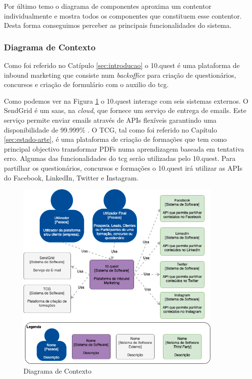 Por último temo o diagrama de componentes aproxima um contentor individualmente e mostra todos os componentes que constituem esse contentor. Desta forma conseguimos perceber as principais funcionalidades do sistema. 


\subsubsection{Diagrama de Contexto}

Como foi referido no Catípulo \ref{sec:introducao} o 10.quest é uma plataforma de inbound marketing que consiste num \textit{backoffice} para criação de questionários, concursos e criação de formulário com o auxilio do \acrshort{tcg}.

Como podemos ver na Figura \ref{fig:arq-contexto} o 10.quest interage com seis sistemas externos. O SendGrid\cite{sg} é um \acrshort{saas}, na \textit{cloud}, que fornece um serviço de entrega de emails. Este serviço permite enviar emails através de APIs flexíveis garantindo uma disponibilidade  de 99.999\% \cite{sguptime}. 
O TCG, tal como foi referido no Capítulo \ref{sec:estado-arte}, é uma plataforma de criação de formações que tem como principal objectivo transformar PDFs numa aprendizagem baseada em tentativa erro. Algumas das funcionalidades do \acrshort{tcg} serão utilizadas pelo 10.quest.
Para partilhar os questionários, concursos e formações o 10.quest irá utilizar as APIs do Facebook, LinkedIn, Twitter e Instagram.


\newpage

\begin{figure}[ht!]
	\begin{center}
		\includegraphics[width=0.9\textwidth]{img/arq/diagrama-contexto}
		\caption{Diagrama de Contexto}
		\label{fig:arq-contexto}
	\end{center}
\end{figure}


